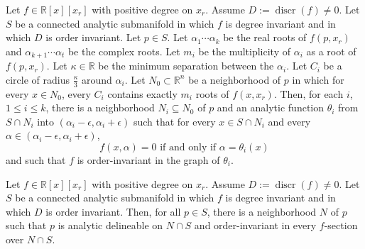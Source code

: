 \begin{lemma}
    \label{lem:nonsplit}
Let $f \in \mathbb{R}[x][x_r]$ with positive degree on $x_r$. Assume $D := \operatorname{discr}(f) \neq 0.$ Let $S$ be a connected analytic submanifold in which $f$ is degree invariant and in which $D$ is order invariant.
Let $p \in S$.
Let $\alpha_1 \cdots \alpha_k$ be the real roots of $f(p, x_r)$ and $\alpha_{k + 1} \cdots \alpha_t$ be the complex roots.
Let $m_i$ be the multiplicity of $\alpha_i$ as a root of $f(p, x_r)$.
Let $\kappa \in \mathbb{R}$ be the minimum separation between the $\alpha_i$.
Let $C_i$ be a circle of radius $\frac{\kappa}{3}$ around $\alpha_i$.
Let $N_0 \subset \mathbb{R}^n$ be a neighborhood of $p$ in which for every $x \in N_0$, every $C_i$ contains exactly $m_i$ roots of $f(x, x_r)$.
Then, for each $i$, $1 \le i \le k$, there is a neighborhood
$N_i \subseteq N_0$ of $p$ and an analytic function $\theta_i$ from
$S \cap N_i$ into $(\alpha_i - \epsilon, \alpha_i + \epsilon)$ such
that for every $x \in S \cap N_i$ and every
$\alpha \in (\alpha_i - \epsilon, \alpha_i + \epsilon)$,
\begin{equation}
f(x, \alpha) = 0 \text{ if and only if } \alpha = \theta_i(x)
\end{equation}
and such that $f$ is order-invariant in the graph of $\theta_i$.
\end{lemma}

\begin{lemma}
    \label{lem:local_an_del}
    Let $f \in \mathbb{R}[x][x_r]$ with positive degree on $x_r$. Assume $D := \operatorname{discr}(f) \neq 0.$ Let $S$ be a connected analytic submanifold in which $f$ is degree invariant and in which $D$ is order invariant. Then, for all $p \in S$, there is a neighborhood $N$ of $p$ such that $p$ is analytic delineable on $N \cap S$ and order-invariant in every $f$-section over $N \cap S$.
\end{lemma}

